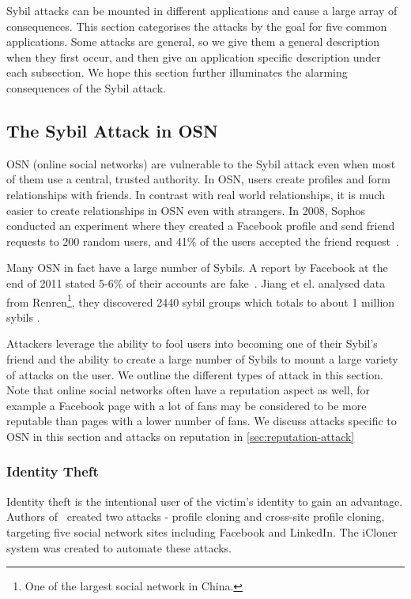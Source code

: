
Sybil attacks can be mounted in different applications and cause a large array
of consequences. This section categorises the attacks by the goal for five
common applications. Some attacks are general, so we give them a general
description when they first occur, and then give an application specific
description under each subsection. We hope this section further illuminates the
alarming consequences of the Sybil attack.

\subsection{The Sybil Attack in OSN}
OSN (online social networks) are vulnerable to the Sybil attack even when most
of them use a central, trusted authority. In OSN, users create
profiles and form relationships with friends. In contrast with real world
relationships, it is much easier to create relationships in OSN even with
strangers. In 2008, Sophos conducted an experiment where they created a Facebook
profile and send friend requests to 200 random users, and 41\% of the users
accepted the friend request~\cite{sophos}.

Many OSN in fact have a large number of Sybils. A report by Facebook at the end
of 2011 stated 5-6\% of their accounts are fake~\cite{facebookfake}. Jiang et el.
analysed data from Renren\footnote{One of the largest social network in China.},
they discovered 2440 sybil groups which totals to about 1 million sybils
\cite{jiang2015understanding}.

Attackers leverage the ability to fool users into becoming one of their Sybil's
friend and the ability to create a large number of Sybils to mount a large
variety of attacks on the user. We outline the different types of attack in this
section. Note that online social networks often have a reputation aspect as
well, for example a Facebook page with a lot of fans may be considered to be
more reputable than pages with a lower number of fans. We discuss attacks
specific to OSN in this section and attacks on reputation in
\autoref{sec:reputation-attack}

\subsubsection{Identity Theft}
Identity theft is the intentional user of the victim's identity to gain an
advantage. Authors of~\cite{bilge2009all} created two attacks - profile cloning
and cross-site profile cloning, targeting five social network sites including
Facebook and LinkedIn. The iCloner system was created to automate these attacks.

